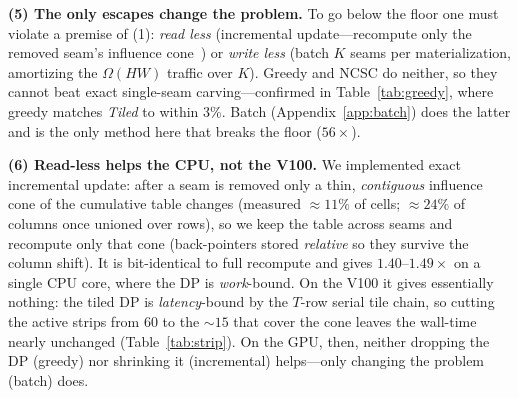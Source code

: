 \documentclass[conference]{IEEEtran}
\begin{document}
\textbf{(5) The only escapes change the problem.}
To go below the floor one must violate a premise of (1): \emph{read less}
(incremental update---recompute only the removed seam's influence
cone~\cite{lee2009}) or \emph{write less} (batch $K$ seams per materialization,
amortizing the $\Omega(HW)$ traffic over $K$). Greedy and NCSC do neither, so
they cannot beat exact single-seam carving---confirmed in Table~\ref{tab:greedy},
where greedy matches \emph{Tiled} to within 3\%. Batch
(Appendix~\ref{app:batch}) does the latter and is the only method here that
breaks the floor ($56\times$).

\textbf{(6) Read-less helps the CPU, not the V100.}
We implemented exact incremental update: after a seam is removed only a thin,
\emph{contiguous} influence cone of the cumulative table changes (measured
${\approx}11\%$ of cells; ${\approx}24\%$ of columns once unioned over rows), so
we keep the table across seams and recompute only that cone (back-pointers
stored \emph{relative} so they survive the column shift). It is bit-identical to
full recompute and gives $1.40$--$1.49\times$ on a single CPU core, where the DP
is \emph{work}-bound. On the V100 it gives essentially nothing: the tiled DP is
\emph{latency}-bound by the $T$-row serial tile chain, so cutting the active
strips from 60 to the ${\sim}15$ that cover the cone leaves the wall-time nearly
unchanged (Table~\ref{tab:strip}). On the GPU, then, neither dropping the DP
(greedy) nor shrinking it (incremental) helps---only changing the problem
(batch) does.



\end{document}

